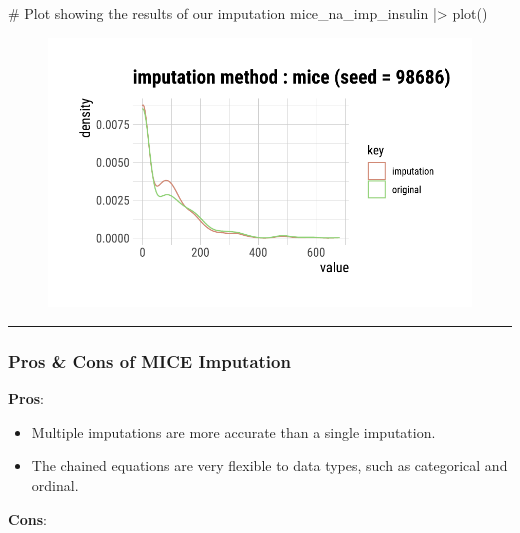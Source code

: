\documentclass[
  letterpaper,
  DIV=11,
  numbers=noendperiod]{scrreprt}
\newenvironment{Shaded}{\begin{snugshade}}{\end{snugshade}}
\newcommand{\CommentTok}[1]{\textcolor[rgb]{0.37,0.37,0.37}{#1}}
\newcommand{\FunctionTok}[1]{\textcolor[rgb]{0.28,0.35,0.67}{#1}}
\newcommand{\NormalTok}[1]{\textcolor[rgb]{0.00,0.23,0.31}{#1}}
\newcommand{\SpecialCharTok}[1]{\textcolor[rgb]{0.37,0.37,0.37}{#1}}
\begin{document}
\begin{Shaded}
\begin{Highlighting}[]
\CommentTok{\# Plot showing the results of our imputation}
\NormalTok{mice\_na\_imp\_insulin }\SpecialCharTok{|\textgreater{}}
  \FunctionTok{plot}\NormalTok{()}
\end{Highlighting}
\end{Shaded}

\begin{figure}[H]

{\centering \includegraphics{./ImputatingLikeDataScientist_files/figure-pdf/unnamed-chunk-23-1.pdf}

}

\end{figure}

\begin{center}\rule{0.5\linewidth}{0.5pt}\end{center}

\hypertarget{pros-cons-of-mice-imputation}{%
\subsubsection{Pros \& Cons of MICE
Imputation}\label{pros-cons-of-mice-imputation}}

\textbf{Pros}:

\begin{itemize}
\item
  Multiple imputations are more accurate than a single imputation.
\item
  The chained equations are very flexible to data types, such as
  categorical and ordinal.
\end{itemize}

\textbf{Cons}:
\end{document}
